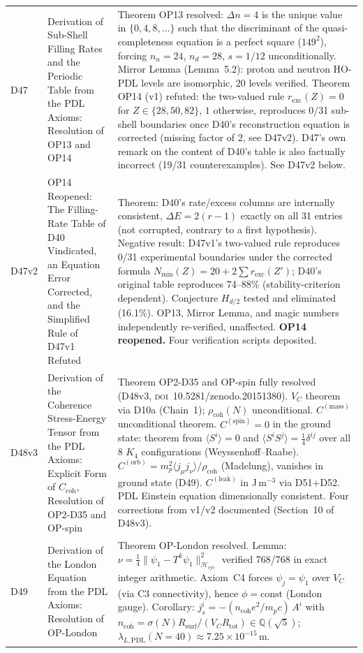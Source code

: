 \documentclass[11pt,a4paper]{article}
\theoremstyle{plain}
\theoremstyle{definition}
\theoremstyle{remark}
\newcommand{\Rsurf}{R_{\mathrm{surf}}}
\newcommand{\Rtot}{R_{\mathrm{tot}}}
\newcommand{\rhocoh}{\rho_{\mathrm{coh}}}
\newcommand{\Ccoh}{C_{\mathrm{coh}}}
\begin{document}
\begin{longtable}{L{1.3cm}L{3.8cm}L{8.0cm}}
D47 & Derivation of Sub-Shell Filling Rates and the Periodic Table from the PDL Axioms: Resolution of OP13 and OP14~\cite{D47} & \textcolor{proofblue}{Theorem} OP13 resolved: $\Delta n=4$ is the unique value in $\{0,4,8,\ldots\}$ such that the discriminant of the quasi-completeness equation is a perfect square ($149^2$), forcing $n_u=24$, $n_d=28$, $s=1/12$ unconditionally. Mirror Lemma (Lemma~5.2): proton and neutron HO-PDL levels are isomorphic, 20 levels verified. \textcolor{negativered}{Theorem OP14 (v1) refuted}: the two-valued rule $r_{\mathrm{exc}}(Z)=0$ for $Z\in\{28,50,82\}$, $1$ otherwise, reproduces 0/31 sub-shell boundaries once D40's reconstruction equation is corrected (missing factor of 2, see D47v2). D47's own remark on the content of D40's table is also factually incorrect (19/31 counterexamples). See D47v2 below. \\[0.4em]
D47v2 & OP14 Reopened: The Filling-Rate Table of D40 Vindicated, an Equation Error Corrected, and the Simplified Rule of D47v1 Refuted~\cite{D47v2} & \textcolor{proofblue}{Theorem}: D40's rate/excess columns are internally consistent, $\Delta E=2(r-1)$ exactly on all 31 entries (not corrupted, contrary to a first hypothesis). \textcolor{negativered}{Negative result}: D47v1's two-valued rule reproduces 0/31 experimental boundaries under the corrected formula $N_{\min}(Z)=20+2\sum r_{\mathrm{exc}}(Z')$; D40's original table reproduces 74--88\% (stability-criterion dependent). Conjecture $H_{d/2}$ tested and eliminated (16.1\%). OP13, Mirror Lemma, and magic numbers independently re-verified, unaffected. \textbf{OP14 reopened.} Four verification scripts deposited.\\[0.4em]
D48v3 & Derivation of the Coherence Stress-Energy Tensor from the PDL Axioms: Explicit Form of $\Ccoh$, Resolution of OP2-D35 and OP-spin~\cite{D48} & \textcolor{proofblue}{Theorem} OP2-D35 and OP-spin fully resolved (D48v3, \textsc{doi}~10.5281/zenodo.20151380). $V_C$ theorem via D10a (Chain~1); $\rhocoh(N)$ unconditional. $C^{(\mathrm{mass})}$ unconditional theorem. $C^{(\mathrm{spin})}=0$ in the ground state: theorem from $\langle S^i\rangle=0$ and $\langle S^iS^j\rangle=\tfrac{1}{4}\delta^{ij}$ over all 8 $K_4$ configurations (Weyssenhoff--Raabe). $C^{(\mathrm{orb})}=m_p^2\langle j_\mu j_\nu\rangle/\rhocoh$ (Madelung), vanishes in ground state (D49). $C^{(\mathrm{leak})}$ in J\,m$^{-3}$ via D51+D52. PDL Einstein equation dimensionally consistent. Four corrections from v1/v2 documented (Section~10 of D48v3).\\[0.4em]
D49 & Derivation of the London Equation from the PDL Axioms: Resolution of OP-London~\cite{D49} & \textcolor{proofblue}{Theorem} OP-London resolved. Lemma: $\nu = \tfrac{1}{4}\|\psi_1 - T^k\psi_1\|^2_{\mathcal{H}_{\mathrm{cyc}}}$ verified 768/768 in exact integer arithmetic. Axiom~C4 forces $\psi_j = \psi_1$ over $V_C$ (via C3 connectivity), hence $\phi = \mathrm{const}$ (London gauge). Corollary: $j^i_s = -(n_{\mathrm{coh}} e^2 / m_p c)\,A^i$ with $n_{\mathrm{coh}} = \sigma(N)\Rsurf/(V_C\Rtot) \in \mathbb{Q}(\sqrt{5})$; $\lambda_{L,\mathrm{PDL}}(N=40) \approx 7.25 \times 10^{-15}$\,m.\\[0.4em]

\end{longtable}
\end{document}
